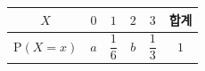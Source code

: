 {\setlength{\tabcolsep}{6pt}\renewcommand{\arraystretch}{1.8}%
\begin{tabular}{|c|c|c|c|c|c|}
\hline
$X$ & $0$ & $1$ & $2$ & $3$ & \textbf{합계} \\
\hline
$\mathrm{P}(X=x)$ & $a$ & $\dfrac{1}{6}$ & $b$ & $\dfrac{1}{3}$ & $1$ \\
\hline
\end{tabular}}
